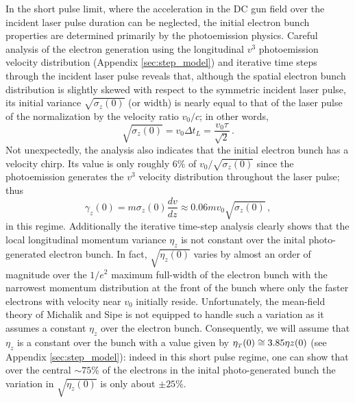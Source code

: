 In the short pulse limit, where the acceleration in the DC gun field over the incident laser pulse duration can be neglected, the initial electron bunch properties are determined primarily by the photoemission physics.
Careful analysis of the electron generation using the longitudinal $ v^{3} $ photoemission velocity distribution (Appendix \ref{sec:step_model}) and iterative time steps through the incident laser pulse reveals that, although the spatial electron bunch distribution is slightly skewed with respect to the symmetric incident laser pulse, its initial variance $ \sqrt{ \sigma_{ z } ( 0 ) } $ (or width) is nearly equal to that of the laser pulse of the normalization by the velocity ratio $ v_{ 0 }/c $; in other words,
\begin{equation} \label{eq:initial_sigma_z}
\sqrt{ \sigma_{ z } ( 0 ) } = v_{ 0 } \Delta t_{L} = \frac{ v_{ 0 } \tau }{ \sqrt{ 2 } } \, \text{.}
\end{equation}
Not unexpectedly, the analysis also indicates that the initial electron bunch has a velocity chirp.
Its value is only roughly 6\% of $ v_{ 0 }/\sqrt{ \sigma_{z} ( 0 ) } $ since the photoemission generates the $ v^{ 3 } $ velocity distribution throughout the laser pulse; thus 
\begin{equation}
\gamma_{ z } ( 0 ) = m \sigma_{ z } ( 0 ) \frac{ d v }{ d z } \approx 0.06 m v_{ 0 } \sqrt{ \sigma_{ z } ( 0 ) } \, ,
\end{equation}
in this regime.
Additionally the iterative time-step analysis clearly shows that the local longitudinal momentum variance $ \eta_{ z } $ is not constant over the inital photo-generated electron bunch.
In fact, $ \sqrt{ \eta_{ z } ( 0 ) } $ varies by almost an order of magnitude over the $ 1/e^{2} $ maximum full-width of the electron bunch with the narrowest momentum distribution at the front of the bunch where only the faster electrons with velocity near $ v_{ 0 } $ initially reside.
Unfortunately, the mean-field theory of Michalik and Sipe \cite{michalik_analytic_2006} is not equipped to handle such a variation as it assumes a constant $ \eta_{ z } $ over the electron bunch.
Consequently, we will assume that $ \eta_{ z } $ is a constant over the bunch with a value given by $ \eta_{{\scriptscriptstyle T} } ( 0 ) \cong 3.85 \eta{ z } ( 0 ) $ (see Appendix \ref{sec:step_model}): indeed in this short pulse regime, one can show that over the central $ \sim 75 \% $ of the electrons in the inital photo-generated bunch the variation in $ \sqrt{ \eta_{ z } ( 0 ) } $ is only about $ \pm 25 \% $.

